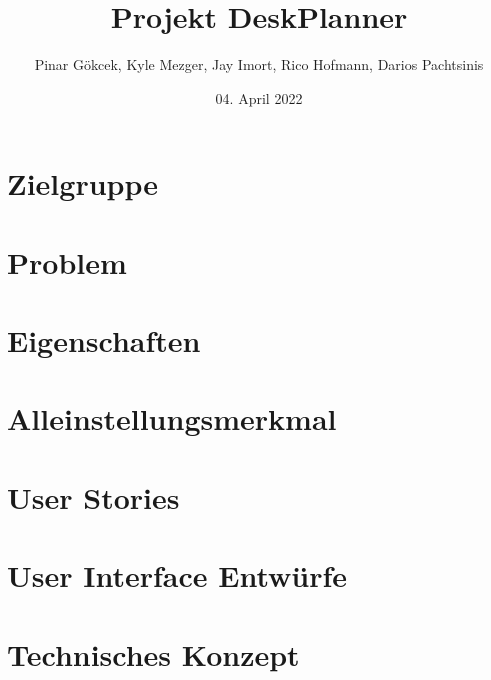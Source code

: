 \documentclass{article}
\title{Projekt DeskPlanner}
\author{Pinar Gökcek, Kyle Mezger, Jay Imort, Rico Hofmann, Darios Pachtsinis}
\date{04. April 2022}
\begin{document}
\begin{titlepage}
    \centering
    \maketitle

    \vfill

\end{titlepage}

\tableofcontents

\section{Zielgruppe}

\section{Problem}

\section{Eigenschaften}

\section{Alleinstellungsmerkmal}

\section{User Stories}

\section{User Interface Entwürfe}

\section{Technisches Konzept}

% 


\end{document}

